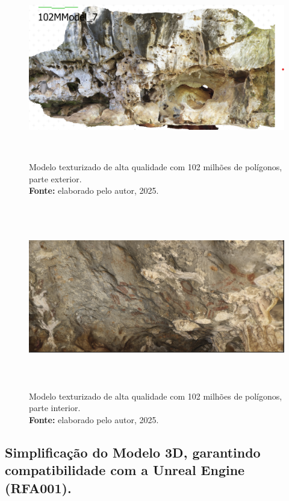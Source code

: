 \begin{enumerate}
\begin{figure}[H]
        \centering
        \includegraphics[height=8cm, keepaspectratio]{img/reality e fotogrametria processo/102M textura.png}
        \caption{Modelo texturizado de alta qualidade com 102 milhões de polígonos, parte exterior. \\
            \textbf{Fonte:} elaborado pelo autor, 2025.}
        \label{fig:texturizado}
\end{figure}
\begin{figure}[H]
        \centering
        \includegraphics[height=8cm, keepaspectratio]{img/reality e fotogrametria processo/interior.png}
        \caption{Modelo texturizado de alta qualidade com 102 milhões de polígonos, parte interior. \\
            \textbf{Fonte:} elaborado pelo autor, 2025.}
        \label{fig:interior}
\end{figure}
\end{enumerate}
    \subsection{Simplificação do Modelo 3D, garantindo compatibilidade com a Unreal Engine (RFA001).}
  
